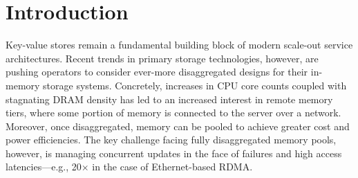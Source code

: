 \section{Introduction}
\label{sec:intro}

Key-value stores remain a fundamental building block of
modern scale-out service architectures.  Recent trends in
primary storage technologies, however, are pushing operators
to consider ever-more disaggregated designs for their
in-memory storage systems.  Concretely, increases in CPU
core counts coupled with stagnating DRAM density has led to
an increased interest in remote memory tiers, where some
portion of memory is connected to the server over a network.
Moreover, once disaggregated, memory can be pooled to
achieve greater cost and power efficiencies.  The key
challenge facing fully disaggregated memory pools, however,
is managing concurrent updates in the face of failures and
high access latencies---e.g., 20$\times$ in the case of
Ethernet-based RDMA.

